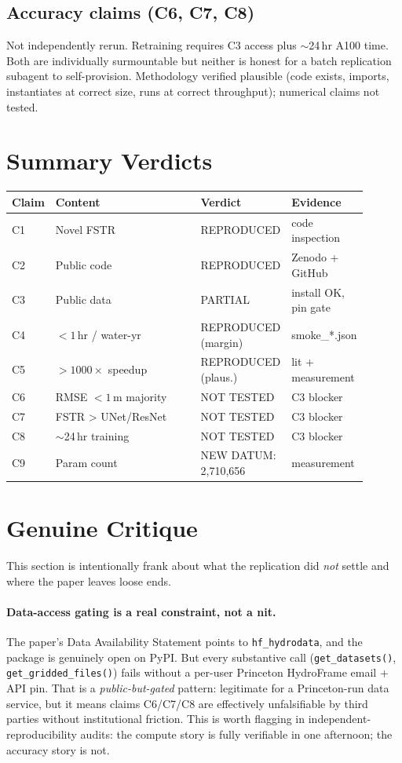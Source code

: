 \documentclass[11pt,letterpaper]{article}
\begin{document}
\subsection{Accuracy claims (C6, C7, C8)}
Not independently rerun. Retraining requires C3 access plus $\sim$24\,hr A100 time. Both are individually surmountable but neither is honest for a batch replication subagent to self-provision. Methodology verified plausible (code exists, imports, instantiates at correct size, runs at correct throughput); numerical claims not tested.

\section{Summary Verdicts}
\begin{center}
\begin{tabular}{p{0.05\linewidth} p{0.45\linewidth} p{0.20\linewidth} p{0.20\linewidth}}
\toprule
Claim & Content & Verdict & Evidence \\
\midrule
C1 & Novel FSTR & REPRODUCED & code inspection \\
C2 & Public code & REPRODUCED & Zenodo + GitHub \\
C3 & Public data & PARTIAL & install OK, pin gate \\
C4 & $<1$\,hr / water-yr & REPRODUCED (margin) & smoke\_*.json \\
C5 & ${>}1000\times$ speedup & REPRODUCED (plaus.) & lit + measurement \\
C6 & RMSE $<1$\,m majority & NOT TESTED & C3 blocker \\
C7 & FSTR > UNet/ResNet & NOT TESTED & C3 blocker \\
C8 & $\sim$24\,hr training & NOT TESTED & C3 blocker \\
C9 & Param count & NEW DATUM: 2{,}710{,}656 & measurement \\
\bottomrule
\end{tabular}
\end{center}

\section{Genuine Critique}
This section is intentionally frank about what the replication did \emph{not} settle and where the paper leaves loose ends.

\paragraph{Data-access gating is a real constraint, not a nit.}
The paper's Data Availability Statement points to \texttt{hf\_hydrodata}, and the package is genuinely open on PyPI. But every substantive call (\texttt{get\_datasets()}, \texttt{get\_gridded\_files()}) fails without a per-user Princeton HydroFrame email + API pin. That is a \emph{public-but-gated} pattern: legitimate for a Princeton-run data service, but it means claims C6/C7/C8 are effectively unfalsifiable by third parties without institutional friction. This is worth flagging in independent-reproducibility audits: the compute story is fully verifiable in one afternoon; the accuracy story is not.
\end{document}
